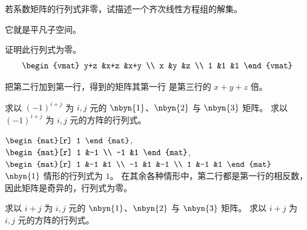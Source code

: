 \begin{exercises}
  \item 
    若系数矩阵的行列式非零，试描述一个齐次线性方程组的解集。
    \begin{answer}
      它就是平凡子空间。  
    \end{answer}
  \recommended \item 
    证明此行列式为零。
    \begin{equation*}
      \begin{vmat}
        y+z  &x+z  &x+y  \\
        x    &y    &z    \\
        1    &1    &1
      \end{vmat}
    \end{equation*}
    \begin{answer} 
      把第二行加到第一行，得到的矩阵其第一行
      是第三行的 $x+y+z$ 倍。  
    \end{answer}
  \item 
    \begin{exparts}
      \partsitem 求以 $(-1)^{i+j}$ 为 $i,j$ 元的
        $\nbyn{1}$、$\nbyn{2}$ 与 $\nbyn{3}$ 矩阵。  
      \partsitem 求以 \( (-1)^{i+j} \) 为 \( i,j \)
        元的方阵的行列式。
    \end{exparts}
    \begin{answer}
      \begin{exparts}
        \partsitem 
          $\begin{mat}[r]
            1
          \end{mat}$,
          $\begin{mat}[r]
            1  &-1  \\
            -1  &1
          \end{mat}$,
          $\begin{mat}[r]
            1   &-1  &1   \\
            -1  &1   &-1  \\
            1   &-1  &1
          \end{mat}$
        \partsitem $\nbyn{1}$ 情形的行列式为 $1$。
          在其余各种情形中，第二行都是第一行的相反数，
          因此矩阵是奇异的，行列式为零。 
      \end{exparts} 
    \end{answer}
  \item 
    \begin{exparts}
      \partsitem 求以 $i+j$ 为 $i,j$ 元的
        $\nbyn{1}$、$\nbyn{2}$ 与 $\nbyn{3}$ 矩阵。  
      \partsitem 求以 $i+j$ 为 
        $i,j$ 元的方阵的行列式。
    \end{exparts}

\end{exercises}
